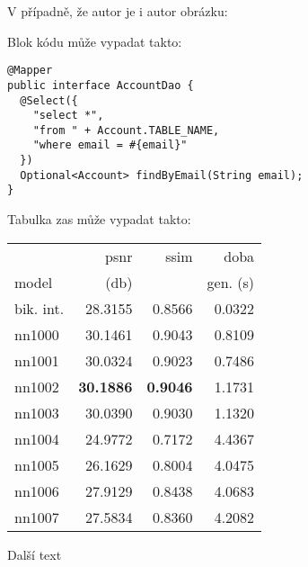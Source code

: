 			V případně, že autor je i autor obrázku:


			Blok kódu může vypadat takto:

			\begin{codeblock}
				\begin{verbatim}
@Mapper
public interface AccountDao {
  @Select({
    "select *",
    "from " + Account.TABLE_NAME,
    "where email = #{email}"
  })
  Optional<Account> findByEmail(String email);
}
				\end{verbatim}
			\end{codeblock}

			Tabulka zas může vypadat takto:

			\begin{table}[hbt!]
				\centering
				\begin{tabular}{| l | r | r | r | }
					\hline
					&        psnr &      ssim &      doba  \\
					model &       (db)    &           & gen. (s) \\
					\hline
					bik. int. & 28.3155 & 0.8566 & 0.0322 \\
					nn1000    & 30.1461 & 0.9043 & 0.8109 \\
					nn1001    & 30.0324 & 0.9023 & 0.7486 \\
					nn1002    & \textbf{30.1886} & \textbf{0.9046} & 1.1731 \\
					nn1003    & 30.0390 & 0.9030 & 1.1320 \\
					nn1004    & 24.9772 & 0.7172 & 4.4367 \\
					nn1005    & 26.1629 & 0.8004 & 4.0475 \\
					nn1006    & 27.9129 & 0.8438 & 4.0683 \\
					nn1007    & 27.5834 & 0.8360 & 4.2082 \\
					\hline
				\end{tabular}
			\end{table}

			\newpage

			Další text


